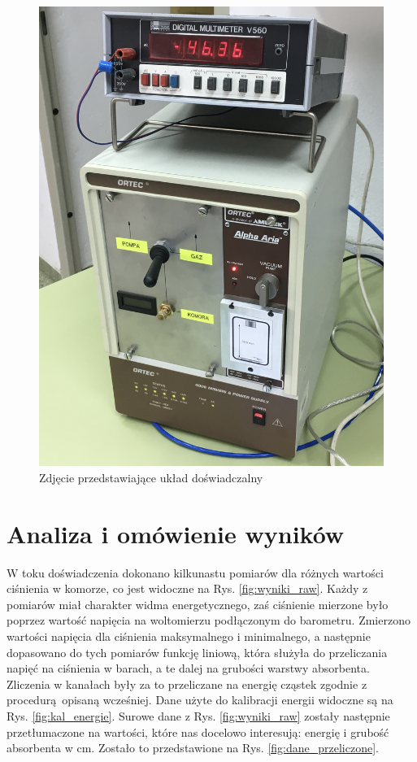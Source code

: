 \documentclass[pra,
superscriptaddress,
amssymb,amsmath,amsmath,showpacs,reprint,twocolumn]{revtex4-1}
\begin{document}
\begin{figure}[h!]
    \centering
    \includegraphics[keepaspectratio, width=0.8\linewidth]{zdj_uklad.JPG}
    \caption{Zdjęcie przedstawiające układ doświadczalny \cite{pracownia}}
    \label{fig:uklad}
\end{figure}

\section{Analiza i omówienie wyników}

W toku doświadczenia dokonano kilkunastu pomiarów dla różnych wartości ciśnienia w komorze, co jest widoczne na Rys. \ref{fig:wyniki_raw}. Każdy z pomiarów miał charakter widma energetycznego, zaś ciśnienie mierzone było poprzez wartość napięcia na woltomierzu podłączonym do barometru. Zmierzono wartości napięcia dla ciśnienia maksymalnego i minimalnego, a następnie dopasowano do tych pomiarów funkcję liniową, która służyła do przeliczania napięć na ciśnienia w barach, a te dalej na grubości warstwy absorbenta. Zliczenia w kanałach były za to przeliczane na energię cząstek zgodnie z procedurą opisaną wcześniej. Dane użyte do kalibracji energii widoczne są na Rys. \ref{fig:kal_energie}. Surowe dane z Rys. \ref{fig:wyniki_raw} zostały następnie przetłumaczone na wartości, które nas docelowo interesują: energię i grubość absorbenta w cm. Zostało to przedstawione na Rys. \ref{fig:dane_przeliczone}.
\end{document}
